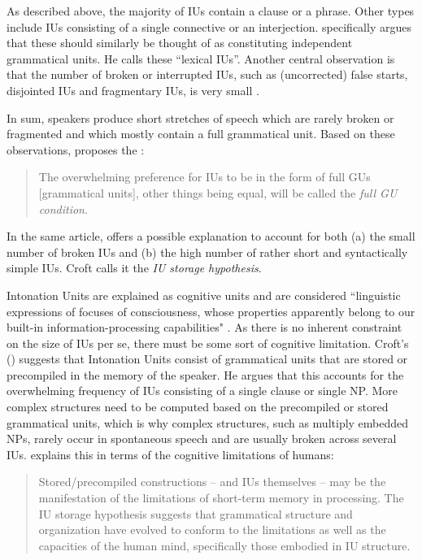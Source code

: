 As described above, the majority of IUs contain a clause or a phrase. Other types include IUs consisting of a single connective or an interjection. \citet[11]{Croft_2007} specifically argues that these should similarly be thought of as constituting independent grammatical units. He calls these “lexical IUs”. Another central observation is that the number of broken or interrupted IUs, such as (uncorrected) false starts, disjointed IUs and fragmentary IUs, is very small  \citep[2\% in the corpus on , see][11]{Croft_2007}.

In sum, speakers produce short stretches of speech which are rarely broken or fragmented and which mostly contain a full grammatical unit. Based on these observations,  \citet[845]{Croft_1995} proposes the \textit{}:

\begin{quote}
	The overwhelming preference for IUs to be in the form of full GUs [grammatical units], other things being equal, will be called the \textit{full GU condition}.
\end{quote} 

In the same article, \citet[872]{Croft_1995} offers a possible explanation to account for both (a) the small number of broken IUs and (b) the high number of rather short and syntactically simple IUs. Croft calls it the \textit{IU storage hypothesis}.


Intonation Units are explained as cognitive units and are considered ``linguistic expressions of focuses of consciousness, whose properties apparently belong to our built-in information-processing capabilities" \citep[48]{chafe1980pear}. As there is no inherent constraint on the size of IUs per se, there must be some sort of cognitive limitation. Croft's (\citeyear[873]{Croft_1995}) \textit{} suggests that Intonation Units consist of grammatical units that are stored or precompiled in the memory of the speaker. He argues that this accounts for the overwhelming frequency of IUs consisting of a single clause or single NP. More complex structures need to be computed based on the precompiled or stored grammatical units, which is why complex structures, such as multiply embedded NPs, rarely occur in spontaneous speech and are usually broken across several IUs. \citet[873]{Croft_1995} explains this in terms of the cognitive limitations of humans:

\begin{quotation}
Stored/precompiled constructions – and IUs themselves – may be the manifestation of the limitations of short-term memory in processing. The IU storage hypothesis suggests that grammatical structure and organization have evolved to conform to the limitations as well as the capacities of the human mind, specifically those embodied in IU structure.

\end{quotation}


